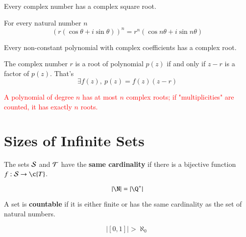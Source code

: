 \documentclass[11pt]{article}
\begin{document}
		\begin{theorem}[9.2.5]
			Every complex number has a complex square root.
		\end{theorem}
		
		\begin{theorem}
			For every natural number $n$
			\[
				(r(\cos \theta + i \sin \theta))^n = r^n (\cos n\theta + i \sin n \theta)
			\]
		\end{theorem}
		
		\begin{theorem}
			Every non-constant polynomial with complex coefficients has a complex root.
		\end{theorem}
		
		\begin{theorem}
			The complex number $r$ is a root of polynomial $p(z)$ if and only if $z-r$ is a factor of $p(z)$. That's 
			\[
				\exists f(z),\ p(z) = f(z)(z - r)
			\]
		\end{theorem}
		
		\begin{theorem}[9.3.8]
			\textcolor{red}{
				A polynomial of degree $n$ has at most $n$ complex roots; if "multiplicities" are counted, it has exactly $n$ roots.
			}
		\end{theorem}
	
	\section{Sizes of Infinite Sets}
		\begin{definition}[10.1.8]
			The sets $\mathcal{{S}}$ and $\mathcal{{T}}$ have the \textbf{same cardinality} if there is a bijective function $f: \mc{S} \to \c{T}$.
		\end{definition}
		
		\begin{theorem}[10.1.13]
			\[
				|\N| = |\Q^+|
			\]
		\end{theorem}
		
		\begin{definition}[10.2.1]
			A set is \textbf{countable} if it is either finite or has the same cardinality as the set of natural numbers.
		\end{definition}
		
		\begin{theorem}[10.2.2]
			\[
				|[0,1]| > \aleph_0
			\]
		\end{theorem}
		
\end{document}
